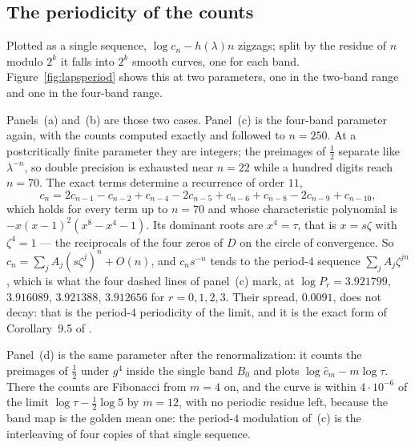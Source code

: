 \documentclass[11pt]{article}
\theoremstyle{plain}
\theoremstyle{definition}
\begin{document}
\subsection{The periodicity of the counts}\label{sec:periodicity}

Plotted as a single sequence, $\log c_n-h(\lambda)n$ zigzags; split by the residue of $n$
modulo $2^k$ it falls into $2^k$ smooth curves, one for each band.  Figure~\ref{fig:lapsperiod}
shows this at two parameters, one in the two-band range and one in the four-band range.

Panels~(a) and~(b) are those two cases.  Panel~(c) is the four-band parameter again, with the
counts computed exactly and followed to $n=250$.  At a postcritically finite parameter they
are integers; the preimages of $\tfrac12$ separate like $\lambda^{-n}$, so double precision is
exhausted near $n=22$ while a hundred digits reach $n=70$.  The exact terms determine a
recurrence of order $11$,
\[
  c_n=2c_{n-1}-c_{n-2}+c_{n-4}-2c_{n-5}+c_{n-6}+c_{n-8}-2c_{n-9}+c_{n-10},
\]
which holds for every term up to $n=70$ and whose characteristic polynomial is
$-x(x-1)^2(x^8-x^4-1)$.  Its dominant roots are $x^4=\tau$, that is $x=s\zeta$ with
$\zeta^4=1$ --- the reciprocals of the four zeros of $D$ on the circle of convergence.  So
$c_n=\sum_jA_j(s\zeta^j)^n+O(n)$, and $c_ns^{-n}$ tends to the period-$4$ sequence
$\sum_jA_j\zeta^{jn}$, which is what the four dashed lines of panel~(c) mark, at
$\log P_r=3.921799$, $3.916089$, $3.921388$, $3.912656$ for $r=0,1,2,3$.  Their spread,
$0.0091$, does not decay: that is the period-$4$ periodicity of the limit, and it is the
exact form of Corollary~9.5 of \cite{MT}.

Panel~(d) is the same parameter after the renormalization: it counts the preimages of
$\tfrac12$ under $g^4$ inside the single band $B_0$ and plots $\log\hat c_m-m\log\tau$.
There the counts are Fibonacci from $m=4$ on, and the curve is within $4\cdot10^{-6}$ of the
limit $\log\tau-\tfrac12\log5$ by $m=12$, with no periodic residue left, because the band map
is the golden mean one: the period-$4$ modulation of~(c) is the interleaving of four copies of
that single sequence.
\end{document}
